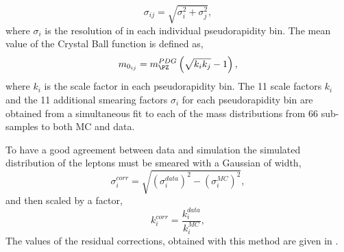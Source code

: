 \begin{equation}
\sigma_{ij} = \sqrt{\sigma_{i}^{2} + \sigma_{j}^{2}} ,
\end{equation}
where $\sigma_{i}$ is the resolution of in each individual pseudorapidity bin.
The mean value of the Crystal Ball function is defined as,
\begin{equation}
m_{0_{ij}} = m_{\PZ}^{PDG} 
          \left( \sqrt{k_{i} k_{j}} - 1 \right) ,
\end{equation}
where $k_{i}$ is the scale factor in each pseudorapidity bin.  The 11 scale
factors $k_{i}$ and the 11 additional smearing factors $\sigma_{i}$ for each
pseudorapidity bin are obtained from a simultaneous fit to each of the mass
distributions from 66 sub-samples to both {MC} and data. 

To have a good agreement between data and simulation the simulated \pT
distribution of the leptons must be smeared with a Gaussian of width,
\begin{equation}
\sigma^{corr}_{i} = 
\sqrt{
\left(\sigma^{data}_{i}\right)^{2} -
\left(\sigma^{MC}_{i}  \right)^{2} 
},
\end{equation}
and then scaled by a factor,
\begin{equation}
k^{corr}_i = \frac{ k^{data}_i}{k^{MC}_i} ,
\end{equation}
The values of the
residual corrections, obtained with this method are given in
.

